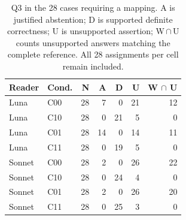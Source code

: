 \begin{table}[t]
\centering
\caption{Q3 in the 28 cases requiring a mapping. A is justified abstention; D is supported definite correctness; U is unsupported assertion; W\,$\cap$\,U counts unsupported answers matching the complete reference. All 28 assignments per cell remain included.}
\label{tab:required}
\setlength{\tabcolsep}{4pt}
\begin{tabular*}{\textwidth}{@{\extracolsep{\fill}}llrrrrr@{}}
\toprule
Reader & Cond. & N & A & D & U & W $\cap$ U \\
\midrule
Luna & C00 & 28 & 7 & 0 & 21 & 12 \\
Luna & C10 & 28 & 0 & 21 & 5 & 0 \\
Luna & C01 & 28 & 14 & 0 & 14 & 11 \\
Luna & C11 & 28 & 0 & 19 & 5 & 0 \\
Sonnet & C00 & 28 & 2 & 0 & 26 & 22 \\
Sonnet & C10 & 28 & 0 & 24 & 4 & 0 \\
Sonnet & C01 & 28 & 2 & 0 & 26 & 20 \\
Sonnet & C11 & 28 & 0 & 25 & 3 & 0 \\
\bottomrule
\end{tabular*}
\end{table}
